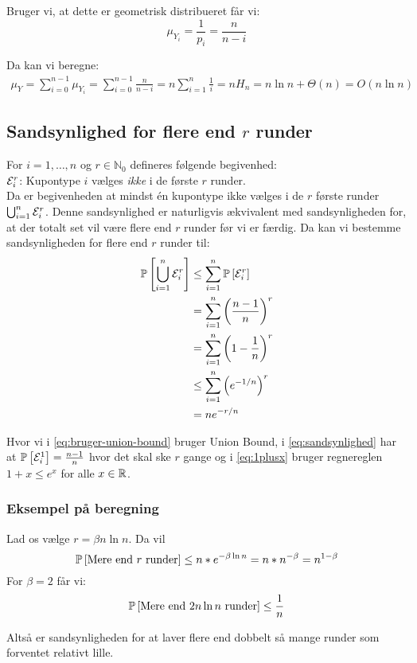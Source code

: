Bruger vi, at dette er geometrisk distribueret får vi:
$$
  \mu_{Y_i} = \frac{1}{p_i} = \frac{n}{n-i}
$$

Da kan vi beregne:
\begin{align*}
  \mu_Y
  = \sum_{i=0}^{n-1} \mu_{Y_i}
  = \sum_{i=0}^{n-1} \frac{n}{n-i}
  = n \sum_{i=1}^n \frac{1}{i}
  = n H_n
  = n \ln n + \Theta(n)
  = O(n \ln n)
\end{align*}


\subsection{Sandsynlighed for flere end $r$ runder}
For $i = 1, \dots, n$ og $r \in \mathbb{N}_0$ defineres følgende begivenhed:\\
$\event_i^r$: Kupontype $i$ vælges \emph{ikke} i de første $r$ runder.\\

Da er begivenheden at mindst én kupontype ikke vælges i de $r$ første runder $\bigcup_{i=1}^n \event_i^r$. Denne sandsynlighed er naturligvis ækvivalent med sandsynligheden for, at der totalt set vil være flere end $r$ runder før vi er færdig. Da kan vi bestemme sandsynligheden for flere end $r$ runder til:
\begin{align}
  \P{\bigcup_{i=1}^n \event_i^r}
  &\leq \sum_{i=1}^n \P{\event_i^r} \label{eq:bruger-union-bound} \\
  &= \sum_{i=1}^n \pfrac{n-1}{n}^r \label{eq:sandsynlighed} \\
  &= \sum_{i=1}^n \p{1 - \frac{1}{n}}^r \nonumber \\
  &\leq \sum_{i=1}^n \p{e^{-1/n}}^r \label{eq:1plusx}\\
  &= n e^{-r/n} \nonumber
\end{align}

Hvor vi i \cref{eq:bruger-union-bound} bruger Union Bound, i \cref{eq:sandsynlighed} har at $\P{\event_i^1} = \frac{n-1}{n}$ hvor det skal ske $r$ gange og i \cref{eq:1plusx} bruger regnereglen $1 + x \leq e^x$ for alle $x \in \R$.


\subsubsection{Eksempel på beregning}
Lad os vælge $r = \beta n \ln n$. Da vil
$$
  \P{\text{Mere end $r$ runder}} \leq n * e^{- \beta \ln n} = n * n^{- \beta} = n^{1 - \beta}
$$
For $\beta = 2$ får vi:
$$
  \P{\text{Mere end $2 n \ln n$ runder}} \leq \frac{1}{n}
$$

Altså er sandsynligheden for at laver flere end dobbelt så mange runder som forventet relativt lille.




